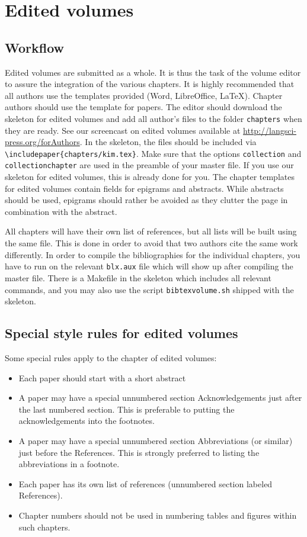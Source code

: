 \chapter{Edited volumes}
\section{Workflow}

Edited volumes are submitted as a whole. It is thus the task of the volume editor to assure the integration of the various chapters. It is highly recommended that all authors use the templates provided (Word, LibreOffice, \LaTeX). 
Chapter authors should use the template for papers. The editor should download the skeleton for edited volumes and add all author's files to the folder \verb+chapters+ when they are ready. See our screencast on edited volumes available at \url{http://langsci-press.org/forAuthors}. In the skeleton, the files should be included via \verb+\includepaper{chapters/kim.tex}+. Make sure that the options \verb+collection+ and \verb+collectionchapter+ are used in the preamble of your master file. If you use our skeleton for edited volumes, this is already done for you. 
The chapter templates for edited volumes contain fields for epigrams and abstracts. While abstracts should be used, epigrams should rather be avoided as they clutter the page in combination with the abstract. 

All chapters will have their own list of references, but all lists will be built using the same {\bibtex} file. This is done in order to avoid that two authors cite the same work differently. In order to compile the bibliographies for the individual chapters, you have to run {\BibTeX} on the relevant \verb+blx.aux+ file which will show up after compiling the master file. There is a Makefile in the skeleton which includes all relevant commands, and you may also use the script \verb+bibtexvolume.sh+ shipped with the skeleton.
     
\section{Special style rules for edited volumes}
Some special rules apply to the chapter of edited volumes:
\begin{itemize}
\item Each paper should start with a short abstract
\item A paper may have a special unnumbered section Acknowledgements just after the last numbered section. This is preferable to putting the acknowledgements into the footnotes.
\item A paper may have a special unnumbered section Abbreviations (or similar) just before the References. This is strongly preferred to listing the abbreviations in a footnote.
\item Each paper has its own list of references (unnumbered section labeled References).
\item Chapter numbers should not be used in numbering tables and figures within such chapters.
\end{itemize}